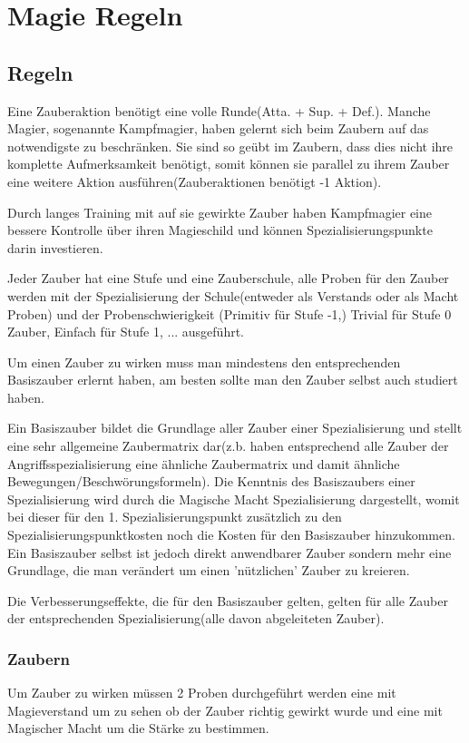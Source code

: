 \chapter{Magie Regeln}
\section{Regeln}
\label{Kampfmagier}
Eine Zauberaktion benötigt eine volle Runde(Atta. + Sup. + Def.).
Manche Magier, sogenannte Kampfmagier, haben gelernt sich beim Zaubern auf das notwendigste zu beschränken. Sie sind so geübt im Zaubern, dass dies nicht ihre komplette Aufmerksamkeit benötigt, somit können sie parallel zu ihrem Zauber eine weitere Aktion ausführen(Zauberaktionen benötigt -1 Aktion).

Durch langes Training mit auf sie gewirkte Zauber haben Kampfmagier eine bessere Kontrolle über ihren Magieschild und können Spezialisierungspunkte darin investieren.

Jeder Zauber hat eine Stufe und eine Zauberschule, alle Proben für den Zauber werden mit der Spezialisierung der Schule(entweder als Verstands oder als Macht Proben) und der Probenschwierigkeit (Primitiv für Stufe -1,) Trivial für Stufe 0 Zauber, Einfach für Stufe 1, ... ausgeführt.

Um einen Zauber zu wirken muss man mindestens den entsprechenden Basiszauber erlernt haben, am besten sollte man den Zauber selbst auch studiert haben.

Ein Basiszauber bildet die Grundlage aller Zauber einer Spezialisierung und stellt eine sehr allgemeine Zaubermatrix dar(z.b. haben entsprechend alle Zauber der Angriffsspezialisierung eine ähnliche Zaubermatrix und damit ähnliche Bewegungen/Beschwörungsformeln).
Die Kenntnis des Basiszaubers einer Spezialisierung wird durch die Magische Macht Spezialisierung dargestellt, womit bei dieser für den 1. Spezialisierungspunkt zusätzlich zu den Spezialisierungspunktkosten noch die Kosten für den Basiszauber hinzukommen.
Ein Basiszauber selbst ist jedoch direkt anwendbarer Zauber sondern mehr eine Grundlage, die man verändert um einen 'nützlichen' Zauber zu kreieren.

Die Verbesserungseffekte, die für den Basiszauber gelten, gelten für alle Zauber der entsprechenden Spezialisierung(alle davon abgeleiteten Zauber).

\subsection{Zaubern}
Um Zauber zu wirken müssen 2 Proben durchgeführt werden eine mit Magieverstand um zu sehen ob der Zauber richtig gewirkt wurde und eine mit Magischer Macht um die Stärke zu bestimmen.

